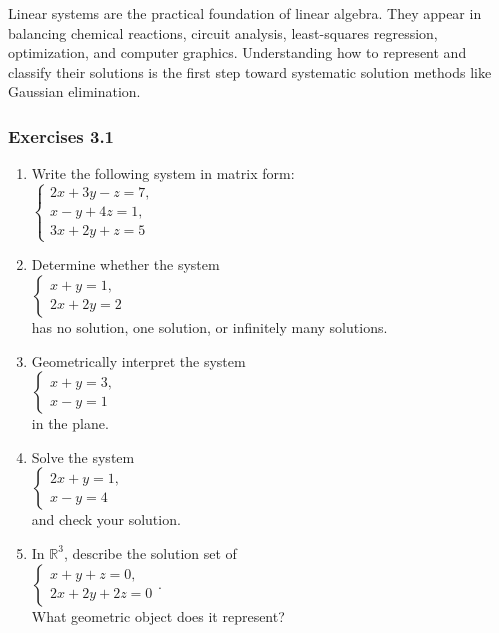 \documentclass[
  12pt,
  a4paper,
]{article}
\begin{document}
Linear systems are the practical foundation of linear algebra. They
appear in balancing chemical reactions, circuit analysis, least-squares
regression, optimization, and computer graphics. Understanding how to
represent and classify their solutions is the first step toward
systematic solution methods like Gaussian elimination.

\subsubsection{Exercises 3.1}\label{exercises-31}

\begin{enumerate}
\def\labelenumi{\arabic{enumi}.}
\item
  Write the following system in matrix form:\\
  \(
  \begin{cases}
  2x + 3y - z = 7, \\
  x - y + 4z = 1, \\
  3x + 2y + z = 5
  \end{cases}
  \)
\item
  Determine whether the system\\
  \(
  \begin{cases}
  x + y = 1, \\
  2x + 2y = 2
  \end{cases}
  \)\\
  has no solution, one solution, or infinitely many solutions.
\item
  Geometrically interpret the system\\
  \(
  \begin{cases}
  x + y = 3, \\
  x - y = 1
  \end{cases}
  \)\\
  in the plane.
\item
  Solve the system\\
  \(
  \begin{cases}
  2x + y = 1, \\
  x - y = 4
  \end{cases}
  \)\\
  and check your solution.
\item
  In \(\mathbb{R}^3\), describe the solution set of\\
  \(
  \begin{cases}
  x + y + z = 0, \\
  2x + 2y + 2z = 0
  \end{cases}
  \).\\
  What geometric object does it represent?
\end{enumerate}
\end{document}
